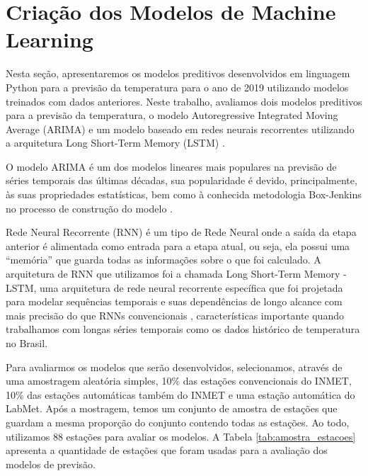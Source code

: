\chapter{Criação dos Modelos de Machine Learning}

Nesta seção, apresentaremos os modelos preditivos desenvolvidos em linguagem Python para a previsão da temperatura para o ano de 2019 utilizando modelos treinados com dados anteriores. Neste trabalho, avaliamos dois modelos preditivos para a previsão da temperatura, o modelo Autoregressive Integrated Moving Average (ARIMA) \cite{whittle1951hypothesis} e um modelo baseado em redes neurais recorrentes utilizando a arquitetura Long Short-Term Memory (LSTM) \cite{hochreiter1997long}.

O modelo ARIMA é um dos modelos lineares mais populares na previsão de séries temporais das últimas décadas, sua popularidade é devido, principalmente, às suas propriedades estatísticas, bem como à conhecida metodologia Box-Jenkins \cite{box2011time} no processo de construção do modelo \cite{zhang2003time}. 

Rede Neural Recorrente (RNN) é um tipo de Rede Neural onde a saída da etapa anterior é alimentada como entrada para a etapa atual, ou seja, ela possui uma “memória” que guarda todas as informações sobre o que foi calculado. A arquitetura de RNN que utilizamos foi a chamada Long Short-Term Memory - LSTM, uma arquitetura de rede neural recorrente específica que foi projetada para modelar sequências temporais e suas dependências de longo alcance com mais precisão do que RNNs convencionais \cite{sak2014long}, características importante quando trabalhamos com longas séries temporais como os dados histórico de temperatura no Brasil. 

Para avaliarmos os modelos que serão desenvolvidos, selecionamos, através de uma amostragem aleatória simples, 10\% das estações convencionais do INMET, 10\% das estações automáticas também do INMET e uma estação automática do LabMet. Após a mostragem, temos um conjunto de amostra de estações que guardam a mesma proporção do conjunto contendo todas as estações. Ao todo, utilizamos 88 estações para avaliar os modelos.  A Tabela \ref{tab:amostra_estacoes} apresenta a quantidade de estações que foram usadas para a avaliação dos modelos de previsão.  

